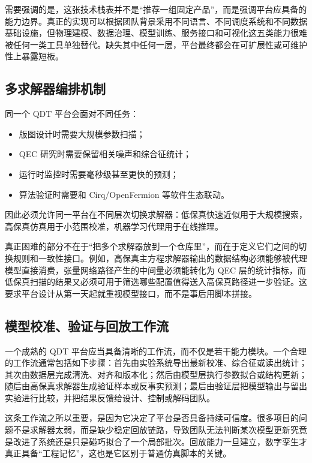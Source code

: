 \documentclass[11pt,a4paper]{article}
\newcommand{\QDT}{QDT}
\newcommand{\QEC}{QEC}
\begin{document}
需要强调的是，这张技术栈表并不是“推荐一组固定产品”，而是强调平台应具备的能力边界。真正的实现可以根据团队背景采用不同语言、不同调度系统和不同数据基础设施，但物理建模、数据治理、模型训练、服务接口和可视化这五类能力很难被任何一类工具单独替代。缺失其中任何一层，平台最终都会在可扩展性或可维护性上暴露短板。

\subsection{多求解器编排机制}

同一个 \QDT{} 平台会面对不同任务：

\begin{itemize}
  \item 版图设计时需要大规模参数扫描；
  \item \QEC{} 研究时需要保留相关噪声和综合征统计；
  \item 运行时监控时需要毫秒级甚至更快的预测；
  \item 算法验证时需要和 Cirq/OpenFermion 等软件生态联动。
\end{itemize}

因此必须允许同一平台在不同层次切换求解器：低保真快速近似用于大规模搜索，高保真仿真用于小范围校准，机器学习代理用于在线推理。

真正困难的部分不在于“把多个求解器放到一个仓库里”，而在于定义它们之间的切换规则和一致性接口。例如，高保真主方程求解器输出的数据结构必须能够被代理模型直接消费，张量网络路径产生的中间量必须能转化为 \QEC{} 层的统计指标，而低保真扫描的结果又必须可用于筛选哪些配置值得送入高保真路径进一步验证。这要求平台设计从第一天起就重视模型接口，而不是事后用脚本拼接。

\subsection{模型校准、验证与回放工作流}

一个成熟的 \QDT{} 平台应当具备清晰的工作流，而不仅是若干能力模块。一个合理的工作流通常包括如下步骤：首先由实验系统导出最新校准、综合征或读出统计；其次由数据层完成清洗、对齐和版本化；然后由模型层执行参数拟合或结构更新；随后由高保真求解器生成验证样本或反事实预测；最后由验证层把模型输出与留出实验进行比较，并把结果反馈给设计、控制或解码团队。

这条工作流之所以重要，是因为它决定了平台是否具备持续可信度。很多项目的问题不是求解器太弱，而是缺少稳定回放链路，导致团队无法判断某次模型更新究竟是改进了系统还是只是碰巧拟合了一个局部批次。回放能力一旦建立，数字孪生才真正具备“工程记忆”，这也是它区别于普通仿真脚本的关键。
\end{document}
